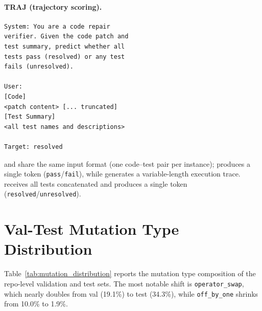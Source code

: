 \paragraph{TRAJ (trajectory scoring).}
{\footnotesize\begin{verbatim}
System: You are a code repair
verifier. Given the code patch and
test summary, predict whether all
tests pass (resolved) or any test
fails (unresolved).

User:
[Code]
<patch content> [... truncated]
[Test Summary]
<all test names and descriptions>

Target: resolved
\end{verbatim}}

\cls{} and \cwm{} share the same input format (one code--test pair per instance); \cls{} produces a single token (\texttt{pass}/\texttt{fail}), while \cwm{} generates a variable-length execution trace. \traj{} receives all tests concatenated and produces a single token (\texttt{resolved}/\texttt{unresolved}).


\section{Val-Test Mutation Type Distribution}
\label{app:mutation_distribution}

Table~\ref{tab:mutation_distribution} reports the mutation type composition of the repo-level validation and test sets. The most notable shift is \texttt{operator\_swap}, which nearly doubles from val (19.1\%) to test (34.3\%), while \texttt{off\_by\_one} shrinks from 10.0\% to 1.9\%.

\begin{table}[h]
\centering
\small
\caption{Repo-level mutation type distribution: validation vs.\ test set, with per-type \cls{} accuracy at two model sizes (seed 42). Shift = test\% $-$ val\%.}
\label{tab:mutation_distribution}
\setlength{\tabcolsep}{3pt}
\end{table}


